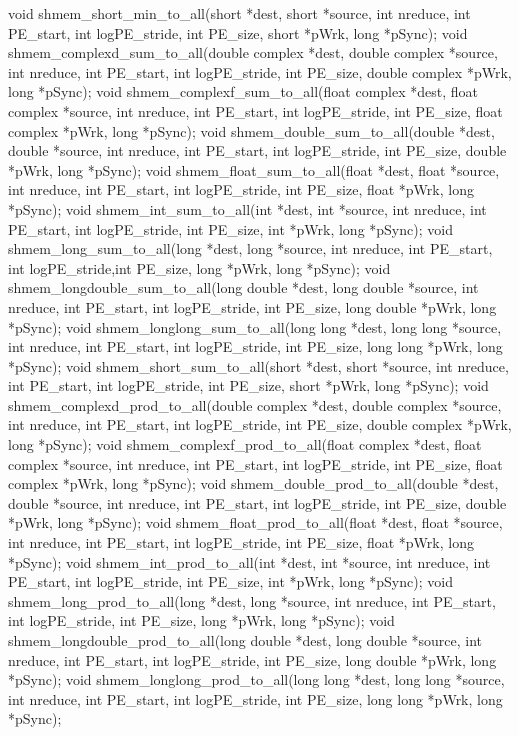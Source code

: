 void shmem_short_min_to_all(short *dest, short *source, int nreduce, int PE_start, int logPE_stride, int PE_size, short *pWrk, long *pSync);
void shmem_complexd_sum_to_all(double complex *dest, double complex *source, int nreduce, int PE_start, int logPE_stride, int PE_size, double complex *pWrk, long *pSync);
void shmem_complexf_sum_to_all(float complex *dest, float complex *source, int nreduce, int PE_start, int logPE_stride, int PE_size, float complex *pWrk, long *pSync);
void shmem_double_sum_to_all(double *dest, double *source, int nreduce, int PE_start, int logPE_stride, int PE_size, double *pWrk, long *pSync);
void shmem_float_sum_to_all(float *dest, float *source, int nreduce, int PE_start, int logPE_stride, int PE_size, float *pWrk, long *pSync);
void shmem_int_sum_to_all(int *dest, int *source, int nreduce, int PE_start, int logPE_stride, int PE_size, int *pWrk, long *pSync);
void shmem_long_sum_to_all(long *dest, long *source, int nreduce, int PE_start, int logPE_stride,int PE_size, long *pWrk, long *pSync);
void shmem_longdouble_sum_to_all(long double *dest, long double *source, int nreduce, int PE_start, int logPE_stride, int PE_size, long double *pWrk, long *pSync);
void shmem_longlong_sum_to_all(long long *dest, long long *source, int nreduce, int PE_start, int logPE_stride, int PE_size, long long *pWrk, long *pSync);
void shmem_short_sum_to_all(short *dest, short *source, int nreduce, int PE_start, int logPE_stride, int PE_size, short *pWrk, long *pSync);
void shmem_complexd_prod_to_all(double complex *dest, double complex *source, int nreduce, int PE_start, int logPE_stride, int PE_size, double complex *pWrk, long *pSync);
void shmem_complexf_prod_to_all(float complex *dest, float complex *source, int nreduce, int PE_start, int logPE_stride, int PE_size, float complex *pWrk, long *pSync);
void shmem_double_prod_to_all(double *dest, double *source, int nreduce, int PE_start, int logPE_stride, int PE_size, double *pWrk, long *pSync);
void shmem_float_prod_to_all(float *dest, float *source, int nreduce, int PE_start, int logPE_stride, int PE_size, float *pWrk, long *pSync);
void shmem_int_prod_to_all(int *dest, int *source, int nreduce, int PE_start, int logPE_stride, int PE_size, int *pWrk, long *pSync);
void shmem_long_prod_to_all(long *dest, long *source, int nreduce, int PE_start, int logPE_stride, int PE_size, long *pWrk, long *pSync);
void shmem_longdouble_prod_to_all(long double *dest, long double *source, int nreduce, int PE_start, int logPE_stride, int PE_size, long double *pWrk, long *pSync);
void shmem_longlong_prod_to_all(long long *dest, long long *source, int nreduce, int PE_start, int logPE_stride, int PE_size, long long *pWrk, long *pSync);
